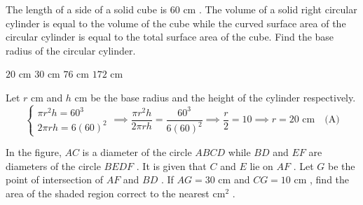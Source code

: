 
\question The length of a side of a solid cube is $60\text{ cm}$ . The volume of a solid right circular cylinder is equal to the volume of the cube while the curved surface area of the circular cylinder is equal to the total surface area of the cube. Find the base radius of the circular cylinder.
\begin{choices}
    \correctchoice $20\text{ cm}$
    \choice $30\text{ cm}$
    \choice $76\text{ cm}$
    \choice $172\text{ cm}$
\end{choices}
\begin{solution}
Let $r\text{ cm}$ and $h\text{ cm}$ be the base radius and the height of the cylinder respectively.
\[ \begin{cases} \pi r^2 h = 60^3 \\ 2\pi r h = 6(60)^2 \end{cases} \implies \frac{\pi r^2 h}{2\pi r h} = \frac{60^3}{6(60)^2} \implies \frac{r}{2} = 10 \implies r = 20\text{ cm} \quad \text{(A)} \]
\end{solution}

\question In the figure, $AC$ is a diameter of the circle $ABCD$ while $BD$ and $EF$ are diameters of the circle $BEDF$ . It is given that $C$ and $E$ lie on $AF$ . Let $G$ be the point of intersection of $AF$ and $BD$ . If $AG = 30\text{ cm}$ and $CG = 10\text{ cm}$ , find the area of the shaded region correct to the nearest $\text{cm}^2$ .

